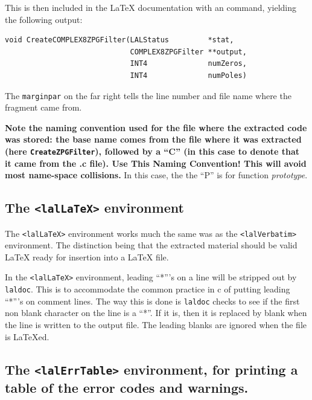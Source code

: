 \documentclass[oneside]{book}
\begin{document}
This is then included in the {\LaTeX} documentation with an
\verb@@ command, yielding the following
output:

\vspace{-1ex}
\mbox{}
\vspace{-3ex}
\begin{verbatim}
void CreateCOMPLEX8ZPGFilter(LALStatus         *stat,
                             COMPLEX8ZPGFilter **output,
                             INT4              numZeros,
                             INT4              numPoles)
\end{verbatim}

The {\tt marginpar} on the far right tells the line number and file
name where the fragment came from.

{\bf Note the naming convention used for the file where the extracted
code was stored: the base name comes from the file where it was
extracted (here {\texttt {CreateZPGFilter}}), followed by a ``C'' (in
this case to denote that it came from the .c file).  {\Large {Use This
Naming Convention!}} This will avoid most name-space collisions.}  In
this case,  the the ``P'' is for function {\it prototype}.


\subsection{The {\texttt {<lalLaTeX>} } environment }

The {\texttt {<lalLaTeX>} } environment works much the same
was as the {\texttt {<lalVerbatim>} } environment. The distinction
being that the extracted material should be valid {\LaTeX} ready
for insertion into a {\LaTeX} file.

In the {\texttt {<lalLaTeX>}} environment, leading ``*'''s on a line
will be stripped out by {\tt laldoc}. This is to accommodate the common
practice in c of putting leading ``*'''s on comment lines.  The way
this is done is {\tt laldoc} checks to see if the first non blank
character on the line is a ``*''. If it is, then it is replaced by
blank when the line is written to the output file. The leading
blanks are ignored when the file is {\LaTeX}ed.


\subsection{The {\texttt {<lalErrTable>} } environment, for printing
a table of the error codes and warnings.}
\end{document}
